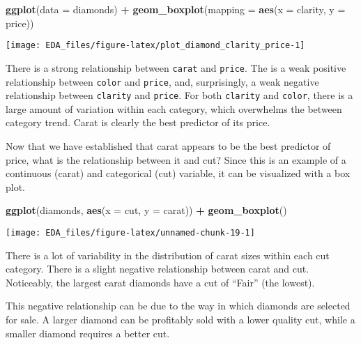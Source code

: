 \documentclass[]{book}
\newenvironment{Shaded}{\begin{snugshade}}{\end{snugshade}}
\newcommand{\DataTypeTok}[1]{\textcolor[rgb]{0.13,0.29,0.53}{#1}}
\newcommand{\KeywordTok}[1]{\textcolor[rgb]{0.13,0.29,0.53}{\textbf{#1}}}
\newcommand{\NormalTok}[1]{#1}
\newcommand{\OperatorTok}[1]{\textcolor[rgb]{0.81,0.36,0.00}{\textbf{#1}}}
\newcommand{\StringTok}[1]{\textcolor[rgb]{0.31,0.60,0.02}{#1}}
\theoremstyle{plain}
\theoremstyle{remark}
\begin{document}
\begin{Shaded}
\begin{Highlighting}[]
\KeywordTok{ggplot}\NormalTok{(}\DataTypeTok{data =}\NormalTok{ diamonds) }\OperatorTok{+}
\StringTok{  }\KeywordTok{geom_boxplot}\NormalTok{(}\DataTypeTok{mapping =} \KeywordTok{aes}\NormalTok{(}\DataTypeTok{x =}\NormalTok{ clarity, }\DataTypeTok{y =}\NormalTok{ price))}
\end{Highlighting}
\end{Shaded}

\begin{center}\texttt{[image: EDA\_files/figure-latex/plot\_diamond\_clarity\_price-1]} \end{center}

There is a strong relationship between \texttt{carat} and
\texttt{price}. The is a weak positive relationship between
\texttt{color} and \texttt{price}, and, surprisingly, a weak negative
relationship between \texttt{clarity} and \texttt{price}. For both
\texttt{clarity} and \texttt{color}, there is a large amount of
variation within each category, which overwhelms the between category
trend. Carat is clearly the best predictor of its price.

Now that we have established that carat appears to be the best predictor
of price, what is the relationship between it and cut? Since this is an
example of a continuous (carat) and categorical (cut) variable, it can
be visualized with a box plot.

\begin{Shaded}
\begin{Highlighting}[]
\KeywordTok{ggplot}\NormalTok{(diamonds, }\KeywordTok{aes}\NormalTok{(}\DataTypeTok{x =}\NormalTok{ cut, }\DataTypeTok{y =}\NormalTok{ carat)) }\OperatorTok{+}
\StringTok{  }\KeywordTok{geom_boxplot}\NormalTok{()}
\end{Highlighting}
\end{Shaded}

\begin{center}\texttt{[image: EDA\_files/figure-latex/unnamed-chunk-19-1]} \end{center}

There is a lot of variability in the distribution of carat sizes within
each cut category. There is a slight negative relationship between carat
and cut. Noticeably, the largest carat diamonds have a cut of ``Fair''
(the lowest).

This negative relationship can be due to the way in which diamonds are
selected for sale. A larger diamond can be profitably sold with a lower
quality cut, while a smaller diamond requires a better cut.
\end{document}
